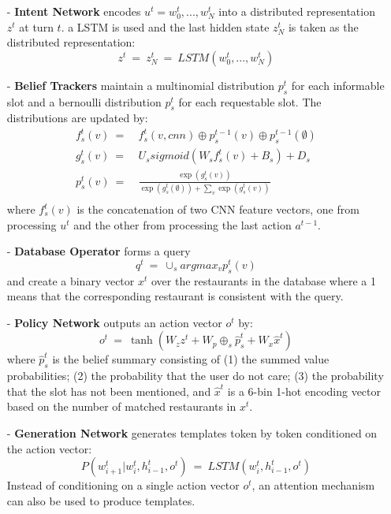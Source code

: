 \begin{itemize}
\item[-] \textbf{Intent Network} encodes $u^{t}=w^{t}_{0}, ..., w^{t}_{N}$ into a distributed representation $z^{t}$ at turn $t$. a LSTM is used and the last hidden state $z^{t}_{N}$ is taken as the distributed representation:
\begin{equation}
z^{t} \ = \ z^{t}_{N} \ = \ LSTM( w^{t}_{0}, ..., w^{t}_{N} )
\end{equation}

\item[-] \textbf{Belief Trackers} maintain a multinomial distribution $p^{t}_{s}$ for each informable slot and a bernoulli distribution $p^{t}_{s}$ for each requestable slot. The distributions are updated by:
\begin{equation}
\begin{aligned}
f^{t}_{s}(v) \ =& \ f^{t}_{s}(v,cnn) \oplus p^{t-1}_{s}(v) \oplus p^{t-1}_{s}(\emptyset) \\
g^{t}_{s}(v) \ =& \ U_{s} sigmoid( W_{s}f^{t}_{s}(v) + B_{s} ) + D_{s} \\
p^{t}_{s}(v) \ =& \ \frac{\exp(g^{t}_{s}(v))}{\exp(g^{t}_{s}(\emptyset)) + \sum_{v} \exp(g^{t}_{s}(v))} \\
\end{aligned}
\end{equation}
where $f^{t}_{s}(v)$ is the concatenation of two CNN feature vectors, one from processing $u^{t}$ and the other from processing the last action $a^{t-1}$.

\item[-] \textbf{Database Operator} forms a query
\begin{equation}
q^{t} \ = \ \cup_{s} { argmax_{v} p^{t}_{s}(v) }
\end{equation}
and create a binary vector $x^{t}$ over the restaurants in the database where a 1 means that the corresponding restaurant is consistent with the query.

\item[-] \textbf{Policy Network} outputs an action vector $o^{t}$ by:
\begin{equation}
o^{t} \ = \ \tanh( W_{z} z^{t} + W_{p} \oplus_{s} \hat{p}^{t}_{s} + W_{x} \hat{x}^{t} )
\end{equation}
where $\hat{p}^{t}_{s}$ is the belief summary consisting of (1) the summed value probabilities; (2) the probability that the user do not care; (3) the probability that the slot has not been mentioned, and $\hat{x}^{t}$ is a 6-bin 1-hot encoding vector based on the number of matched restaurants in $x^{t}$.

\item[-] \textbf{Generation Network} generates templates token by token conditioned on the action vector:
\begin{equation}
P(w^{t}_{i+1} | w^{t}_{i}, h^{t}_{i-1}, o^{t}) \ = \ LSTM( w^{t}_{i}, h^{t}_{i-1}, o^{t} )
\end{equation}
Instead of conditioning on a single action vector $o^{t}$, an attention mechanism can also be used to produce templates.

\end{itemize}